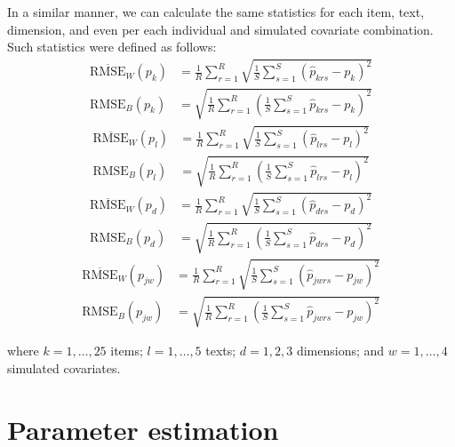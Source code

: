 In a similar manner, we can calculate the same statistics for each item, text, dimension, and even per each individual and simulated covariate combination. Such statistics were defined as follows:
%
\begin{align}
	\overline{\text{RMSE}}_{W} \left( p_{k} \right) &= \frac{1}{R} \sum_{r=1}^{R} \sqrt{ \frac{1}{S} \sum_{s=1}^{S} \left( \hat{p}_{krs} - p_{k} \right)^2} \\
	\text{RMSE}_{B} \left( p_{k} \right) &= \sqrt{ \frac{1}{R} \sum_{r=1}^{R}  \left( \frac{1}{S} \sum_{s=1}^{S} \hat{p}_{krs} - p_{k} \right)^2} 
\end{align}
%
\begin{align}
	\overline{\text{RMSE}}_{W} \left( p_{l} \right) &= \frac{1}{R} \sum_{r=1}^{R} \sqrt{ \frac{1}{S} \sum_{s=1}^{S} \left( \hat{p}_{lrs} - p_{l} \right)^2} \\
	\text{RMSE}_{B} \left( p_{l} \right) &= \sqrt{ \frac{1}{R} \sum_{r=1}^{R}  \left( \frac{1}{S} \sum_{s=1}^{S} \hat{p}_{lrs} - p_{l} \right)^2} 
\end{align}
%
\begin{align}
	\overline{\text{RMSE}}_{W} \left( p_{d} \right) &= \frac{1}{R} \sum_{r=1}^{R} \sqrt{ \frac{1}{S} \sum_{s=1}^{S} \left( \hat{p}_{drs} - p_{d} \right)^2} \\
	\text{RMSE}_{B} \left( p_{d} \right) &= \sqrt{ \frac{1}{R} \sum_{r=1}^{R}  \left( \frac{1}{S} \sum_{s=1}^{S} \hat{p}_{drs} - p_{d} \right)^2} 
\end{align}
%
\begin{align}
	\overline{\text{RMSE}}_{W} \left( p_{jw} \right) &= \frac{1}{R} \sum_{r=1}^{R} \sqrt{ \frac{1}{S} \sum_{s=1}^{S} \left( \hat{p}_{jwrs} - p_{jw} \right)^2} \\
	\text{RMSE}_{B} \left( p_{jw} \right) &= \sqrt{ \frac{1}{R} \sum_{r=1}^{R}  \left( \frac{1}{S} \sum_{s=1}^{S} \hat{p}_{jwrs} - p_{jw} \right)^2} 
\end{align}

\noindent where $k= 1, \dots, 25$ items; $l=1, \dots, 5$ texts; $d=1,2,3$ dimensions; and $w=1, \dots, 4$ simulated covariates.


\section{Parameter estimation}

